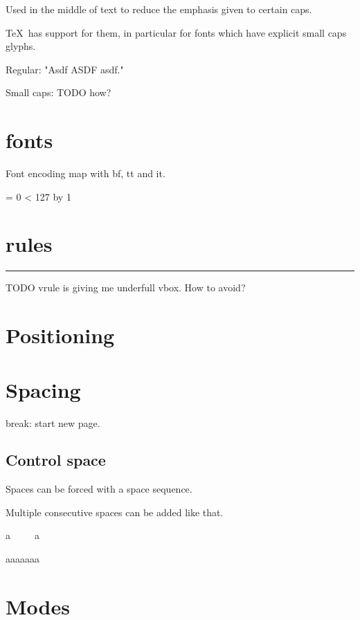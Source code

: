     Used in the middle of text to reduce the emphasis given to certain caps.

    \TeX\ has support for them, in particular for fonts which have explicit small caps glyphs.

    Regular: "Asdf ASDF asdf."

    Small caps: TODO how? %

\section{fonts}

  Font encoding map with bf, tt and it.

   = 0
  \loop
    [\number\count255 =
      \char\number\count255 \
      {\bf \char\number\count255}
      {\it \char\number\count255}
      {\tt \char\number\count255}
    ]
  \ifnum{} < 127
  \advance\count255 by 1
  \repeat

\section{rules}

  \hrule

  TODO vrule is giving me underfull vbox. How to avoid?

  \vrule height 1mm

\section{Positioning}

\section{Spacing}

  \bs break: start new page.

  \break

  \subsection{Control space}

    Spaces can be forced with a \bs space sequence.

    Multiple consecutive spaces can be added like that.

    a\ \ \ \ \ a

    aaaaaaa

\section{Modes}

